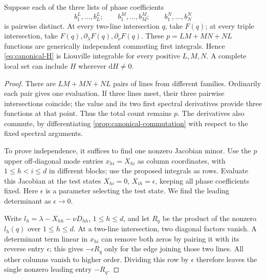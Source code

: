 \begin{theorem}\label{thm:distinct-phase-evaluations}
Suppose each of the three lists of phase coefficients
\[
 b_1^L,\ldots,b_L^L;\qquad
 b_1^M,\ldots,b_M^M;\qquad
 b_1^N,\ldots,b_N^N
\]
is pairwise distinct.
At every two-line intersection $q$, take $F(q)$; at every triple
intersection, take $F(q),\partial_\lambda F(q),\partial_\nu F(q)$.
These $p=LM+MN+NL$ functions are generically independent commuting
first integrals. Hence \cref{eq:canonical-H} is Liouville integrable
for every positive $L,M,N$. A complete local set can include $H$
wherever $\mathrm dH\ne0$.
\end{theorem}
\begin{proof}
There are $LM+MN+NL$ pairs of lines from different families.
Ordinarily each pair gives one evaluation. If three lines meet,
their three pairwise intersections coincide; the value and its two
first spectral derivatives provide three functions at that point.
Thus the total count remains $p$. The derivatives also commute,
by differentiating \cref{prop:canonical-commutation} with respect
to the fixed spectral arguments.

To prove independence, it suffices to find one nonzero Jacobian minor.
Use the $p$ upper off-diagonal mode entries $x_{hi}=X_{hi}$ as
column coordinates, with $1\leq h<i\leq d$ in different blocks;
use the proposed integrals as rows. Evaluate this Jacobian at the
test states $X_{hi}=0$, $X_{ih}=\epsilon$, keeping all phase
coefficients fixed. Here $\epsilon$ is a parameter selecting the
test state. We find the leading determinant as $\epsilon\to0$.

Write $l_h=\lambda-X_{hh}-\nu D_{hh}$, $1\leq h\leq d$,
and let $R_q$ be the product of the nonzero $l_h(q)$ over
$1\leq h\leq d$. At a two-line intersection, two diagonal
factors vanish. A determinant term linear in $x_{hi}$ can remove
both zeros by pairing it with its reverse entry $\epsilon$;
this gives $-\epsilon R_q$ only for the edge joining those two
lines. All other columns vanish to higher order. Dividing this
row by $\epsilon$ therefore leaves the single nonzero leading
entry $-R_q$.


\end{proof}
